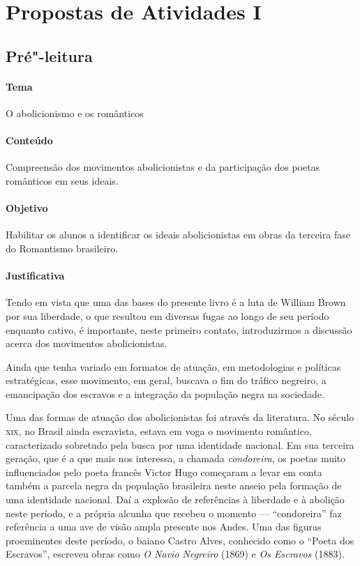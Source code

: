 \documentclass[12pt]{extarticle}
\begin{document}

\pagebreak
\section{Propostas de Atividades I}

\subsection{Pré"-leitura}

\paragraph{Tema} O abolicionismo e os românticos

\paragraph{Conteúdo} Compreensão dos movimentos abolicionistas e da
participação dos poetas românticos em seus ideais.

\paragraph{Objetivo} Habilitar os alunos a identificar os ideais
abolicionistas em obras da terceira fase do Romantismo brasileiro.

\paragraph{Justificativa} Tendo em vista que uma das bases do presente
livro é a luta de William Brown por sua liberdade, o que resultou em diversas
fugas ao longo de seu período enquanto cativo, é importante, neste primeiro
contato, introduzirmos a discussão acerca dos movimentos abolicionistas.

Ainda que tenha variado em formatos de atuação, em
metodologias e políticas estratégicas, esse movimento, em geral, buscava
o fim do tráfico negreiro, a emancipação dos escravos e a integração da
população negra na sociedade. 

Uma das formas de atuação dos abolicionistas foi através
da literatura. No século \textsc{xix}, no Brasil ainda escravista,
estava em voga o movimento romântico, caracterizado sobretudo pela busca 
por uma identidade nacional. Em sua terceira geração, que é a que mais nos
interessa, a chamada
\emph{condoreira}, os poetas muito influenciados pelo poeta francês Victor Hugo
começaram a levar em conta também a parcela negra da população brasileira
neste anseio pela formação de uma identidade nacional. Daí a explosão 
de referências à liberdade e à abolição neste período, e a própria
alcunha que recebeu o momento --- ``condoreira'' faz referência a 
uma ave de visão ampla presente nos Andes. Uma das figuras proeminentes 
deste período, o baiano Castro Alves, conhecido como o ``Poeta 
dos Escravos'', escreveu obras como \emph{O Navio Negreiro} (1869) e 
\emph{Os Escravos} (1883).
\end{document}
